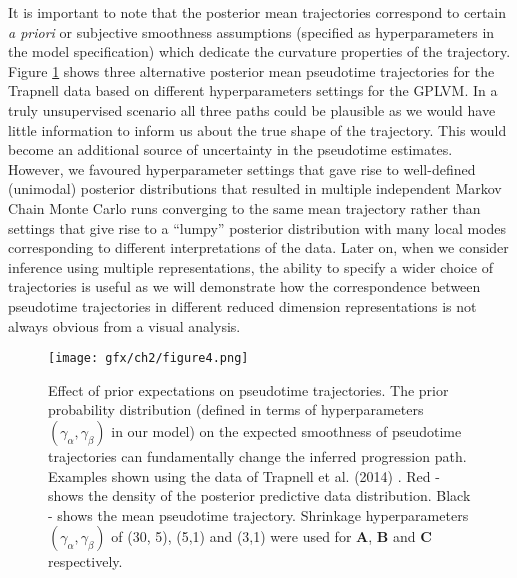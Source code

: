 It is important to note that the posterior mean trajectories correspond to certain \textit{a priori} or subjective smoothness assumptions (specified as hyperparameters in the model specification) which dedicate the curvature properties of the trajectory. Figure \ref{fig:varygamma} shows three alternative posterior mean pseudotime trajectories for the Trapnell data based on different hyperparameters settings for the GPLVM. In a truly unsupervised scenario all three paths could be plausible as we would have little information to inform us about the true shape of the trajectory. This would become an additional source of uncertainty in the pseudotime estimates. However, we favoured hyperparameter settings that gave rise to well-defined (unimodal) posterior distributions that resulted in multiple independent Markov Chain Monte Carlo runs converging to the same mean trajectory rather than settings that give rise to a ``lumpy'' posterior distribution with many local modes corresponding to different interpretations of the data. Later on, when we consider inference using multiple representations, the ability to specify a wider choice of trajectories is useful as we will demonstrate how the correspondence between pseudotime trajectories in different reduced dimension representations is not always obvious from a visual analysis.

\begin{figure}

	\centering
	\texttt{[image: gfx/ch2/figure4.png]}
  \caption[Effect of prior expectations on pseudotime trajectories.]{Effect of prior expectations on pseudotime trajectories.
      The prior probability distribution (defined in terms of hyperparameters $(\gamma_\alpha, \gamma_\beta)$ in our model) on the expected smoothness of pseudotime trajectories can fundamentally change the inferred progression path. Examples shown using the data of Trapnell et al. (2014) \cite{Trapnell2014-xi}. Red - shows the density of the posterior predictive data distribution. Black - shows the mean pseudotime trajectory. Shrinkage hyperparameters $(\gamma_\alpha, \gamma_\beta)$ of (30, 5), (5,1) and (3,1) were used for \textbf{A}, \textbf{B} and \textbf{C} respectively.}
	\label{fig:varygamma}
\end{figure}

